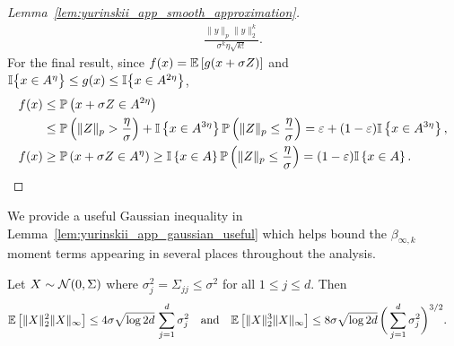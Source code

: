\begin{proof}[Lemma~\ref{lem:yurinskii_app_smooth_approximation}]
\begin{align*}
    \frac{\|y\|_p \|y\|_2^k}{\sigma^k \eta \sqrt{k!}}.
  \end{align*}
  For the final result, since
  $f(x) = \mathbb{E} \left[ g(x + \sigma Z) \right]$ and
  $\mathbb{I}\big\{x \in A^\eta\big\}\leq g(x)\leq \mathbb{I}\big\{x \in A^{2\eta}\big\}$,
  \begin{align*}
    f(x)
    &\leq
    \mathbb{P} \left( x + \sigma Z \in A^{2 \eta} \right) \\
    &\leq
    \mathbb{P} \left( \|Z\|_p > \frac{\eta}{\sigma} \right)
    + \mathbb{I} \left\{ x \in A^{3 \eta} \right\}
    \mathbb{P} \left( \|Z\|_p \leq \frac{\eta}{\sigma} \right)
    = \varepsilon
    + (1 - \varepsilon) \mathbb{I} \left\{ x \in A^{3 \eta} \right\}, \\
    f(x)
    &\geq
    \mathbb{P} \left( x + \sigma Z \in A^{\eta} \right)
    \geq
    \mathbb{I} \left\{ x \in A \right\}
    \mathbb{P} \left( \|Z\|_p \leq \frac{\eta}{\sigma} \right)
    = (1 - \varepsilon) \mathbb{I} \left\{ x \in A \right\}.
  \end{align*}
\end{proof}

We provide a useful Gaussian inequality in
Lemma~\ref{lem:yurinskii_app_gaussian_useful}
which helps bound the $\beta_{\infty,k}$ moment terms appearing in several
places throughout the analysis.

\begin{lemma}%
  \label{lem:yurinskii_app_gaussian_useful}

  Let $X \sim \mathcal{N}(0, \Sigma)$
  where $\sigma_j^2 = \Sigma_{j j} \leq \sigma^2$ for all $1 \leq j \leq d$.
  Then
  \begin{align*}
    \mathbb{E}\left[
      \|X\|_2^2
      \|X\|_\infty
    \right]
    &\leq
    4 \sigma \sqrt{\log 2d}
    \,\sum_{j=1}^d \sigma_j^2
    &&\text{and}
    &\mathbb{E}\left[
      \|X\|_2^3
      \|X\|_\infty
    \right]
    &\leq
    8 \sigma \sqrt{\log 2d}
    \,\bigg( \sum_{j=1}^d \sigma_j^2 \bigg)^{3/2}.
  \end{align*}
\end{lemma}

